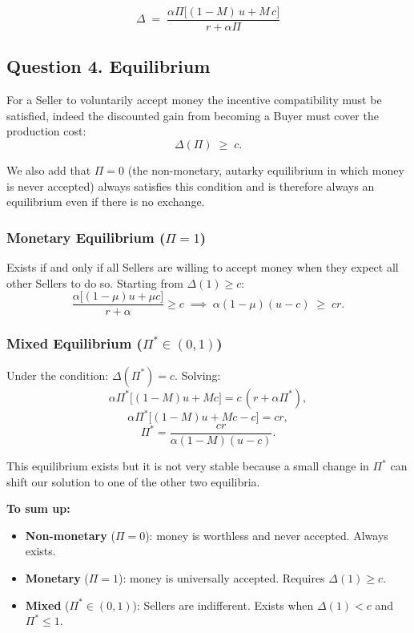 \documentclass[11pt, a4paper]{article}
\begin{document}
\[
  \Delta \;=\; \frac{\alpha\Pi\bigl[(1- M)\,u +  M\,c\bigr]}{r + \alpha\Pi}
\]



\subsection*{Question 4. Equilibrium}

For a Seller to voluntarily accept money the incentive compatibility must be satisfied, indeed the discounted gain from becoming a
Buyer must cover the production cost:
\[
  \Delta(\Pi) \;\geq\; c.
\]

We also add that $\Pi = 0$ (the non-monetary, autarky equilibrium in which money is never accepted) always satisfies this condition and is therefore always an equilibrium even if there is no exchange.

\subsubsection*{Monetary Equilibrium ($\Pi = 1$)}
Exists if and only if all Sellers are willing to accept money when they expect
all other Sellers to do so. Starting from $\Delta(1) \geq c$:
\[
  \frac{\alpha\bigl[(1-\mu)u + \mu c\bigr]}{r + \alpha} \geq c
  \;\implies\;
  \alpha(1-\mu)(u-c) \;\geq\; cr.
\]


\subsubsection*{Mixed Equilibrium ($\Pi^* \in (0,1)$)}

Under the condition: $\Delta(\Pi^*) = c$. Solving:
\[
  \alpha\Pi^*\bigl[(1- M)u +  M c\bigr] = c\,(r + \alpha\Pi^*),
\]
\[
  \alpha\Pi^*\bigl[(1- M)u +  M c - c\bigr] = cr,
\]
\[
  \Pi^* = \frac{cr}{\alpha(1- M)(u-c)}.
\]

This equilibrium exists but it is not very stable because a small change in $\Pi^*$ can shift our solution to one of the other two equilibria.

\textbf{To sum up:}
\begin{itemize}
  \item \textbf{Non-monetary} ($\Pi = 0$): money is worthless and never accepted.
        Always exists.
  \item \textbf{Monetary} ($\Pi = 1$): money is universally accepted.
        Requires $\Delta(1) \geq c$.
  \item \textbf{Mixed} ($\Pi^* \in (0,1)$): Sellers are indifferent.
        Exists when $\Delta(1) < c$ and $\Pi^* \leq 1$.
\end{itemize}
\end{document}
